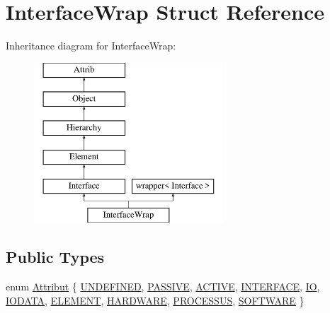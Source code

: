 \hypertarget{structInterfaceWrap}{}\section{Interface\+Wrap Struct Reference}
\label{structInterfaceWrap}
Inheritance diagram for Interface\+Wrap\+:\begin{figure}[H]
\begin{center}
\leavevmode
\includegraphics[height=6.000000cm]{structInterfaceWrap}
\end{center}
\end{figure}
\subsection*{Public Types}
\begin{DoxyCompactItemize}
\item 
enum \hyperlink{classAttrib_a69e171d7cc6417835a5a306d3c764235}{Attribut} \{ \newline
\hyperlink{classAttrib_a69e171d7cc6417835a5a306d3c764235a3a8da2ab97dda18aebab196fe4100531}{U\+N\+D\+E\+F\+I\+N\+ED}, 
\hyperlink{classAttrib_a69e171d7cc6417835a5a306d3c764235a2bfb2af57b87031d190a05fe25dd92ed}{P\+A\+S\+S\+I\+VE}, 
\hyperlink{classAttrib_a69e171d7cc6417835a5a306d3c764235a3b1fec929c0370d1436f2f06e298fb0d}{A\+C\+T\+I\+VE}, 
\hyperlink{classAttrib_a69e171d7cc6417835a5a306d3c764235aa27c16b480a369ea4d18b07b2516bbc7}{I\+N\+T\+E\+R\+F\+A\+CE}, 
\newline
\hyperlink{classAttrib_a69e171d7cc6417835a5a306d3c764235a1420a5b8c0540b2af210b6975eded7f9}{IO}, 
\hyperlink{classAttrib_a69e171d7cc6417835a5a306d3c764235a0af3b0d0ac323c1704e6c69cf90add28}{I\+O\+D\+A\+TA}, 
\hyperlink{classAttrib_a69e171d7cc6417835a5a306d3c764235a7788bc5dd333fd8ce18562b269c9dab1}{E\+L\+E\+M\+E\+NT}, 
\hyperlink{classAttrib_a69e171d7cc6417835a5a306d3c764235a61ceb22149f365f1780d18f9d1459423}{H\+A\+R\+D\+W\+A\+RE}, 
\newline
\hyperlink{classAttrib_a69e171d7cc6417835a5a306d3c764235a75250e29692496e73effca2c0330977f}{P\+R\+O\+C\+E\+S\+S\+US}, 
\hyperlink{classAttrib_a69e171d7cc6417835a5a306d3c764235a103a67cd0b8f07ef478fa45d4356e27b}{S\+O\+F\+T\+W\+A\+RE}
 \}
\end{DoxyCompactItemize}
